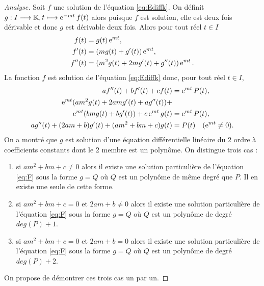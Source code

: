 \begin{proof}[Analyse]
Soit  \(f\) une solution de l'équation \eqref{eq:Ediffk}. On définit \(g:I \longrightarrow \mathbb{K}, t \longmapsto \operatorname{e}^{-mt}f(t)\) alors puisque \(f\) est solution, elle est deux fois dérivable et donc \(g\) est dérivable deux fois. Alors pour tout réel \(t \in I\)
\begin{align}
    f(t)&=g(t)\operatorname{e}^{mt}, \\ 
    f'(t)&=(mg(t)+g'(t))\operatorname{e}^{mt}, \\
    f''(t)&=(m^2g(t)+2mg'(t)+g''(t))\operatorname{e}^{mt}.
\end{align}
La fonction \(f\) est solution de l'équation \eqref{eq:Ediffk} donc, pour tout réel \(t \in I\), 
\begin{align}
    af''(t)+bf'(t)+cf(t)&=\operatorname{e}^{mt} P(t), \\
    \operatorname{e}^{mt}(am^2g(t)+2amg'(t)+ag''(t))+&  \notag \\ \operatorname{e}^{mt}(bmg(t)+bg'(t))+c\operatorname{e}^{mt}g(t)&=\operatorname{e}^{mt}P(t), \\
    ag''(t)+(2am+b)g'(t) +(am^2+bm+c)g(t)&=P(t) \quad (\operatorname{e}^{mt} \neq 0). \label{eq:F}
\end{align}
On a montré que \(g\) est solution d'une équation différentielle linéaire du 2 ordre à coefficients constants dont le 2 membre est un polynôme. On distingue trois cas :
\begin{enumerate}
\item si \(am^2+bm+c \neq 0\) alors il existe une solution particulière de l'équation \eqref{eq:F} sous la forme \(g=Q\) où \(Q\) est un polynôme de même degré que \(P\). Il en existe une seule de cette forme.
\item si \(am^2+bm+c=0\) et \(2am+b \neq 0\) alors il existe une solution particulière de l'équation \eqref{eq:F} sous la forme \(g=Q\) où \(Q\) est un polynôme de degré \(deg(P)+1\).
\item si  \(am^2+bm+c=0\) et \(2am+b = 0\) alors il existe une solution particulière de l'équation \eqref{eq:F} sous la forme \(g=Q\) où \(Q\) est un polynôme de degré \(deg(P)+2\).
\end{enumerate}
On propose de démontrer ces trois cas un par un.


\end{proof}
